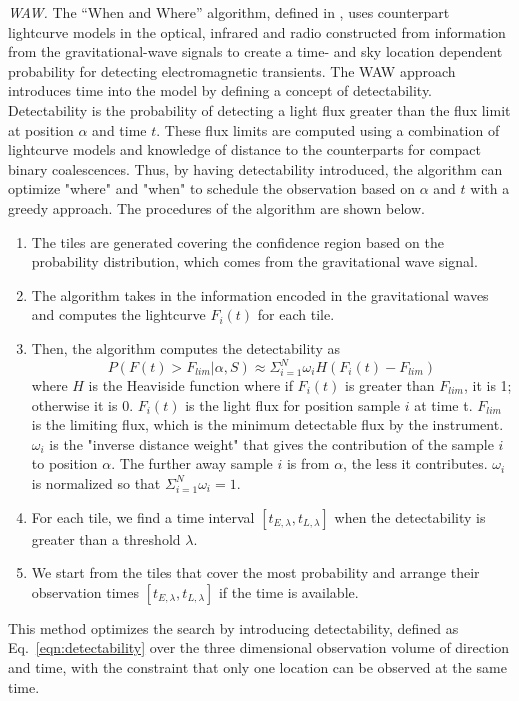 \documentclass[twocolumn]{aastex62}
\begin{document}
\emph{WAW.} The ``When and Where'' algorithm, defined in \cite{SoCo2017}, uses counterpart lightcurve models in the optical, infrared and radio constructed from information from the gravitational-wave signals to create a time- and sky location dependent probability for detecting electromagnetic transients. The WAW approach introduces time into the model by defining a concept of detectability. Detectability is the probability of detecting a light flux greater than the flux limit at position $\alpha$ and time $t$. These flux limits are computed using a combination of lightcurve models and knowledge of distance to the counterparts for compact binary coalescences. Thus, by having detectability introduced, the algorithm can optimize "where" and "when" to schedule the observation based on $\alpha$ and $t$ with a greedy approach. The procedures of the algorithm are shown below.
\begin{enumerate}
\item The tiles are generated covering the confidence region based on the probability distribution, which comes from the gravitational wave signal.
\item The algorithm takes in the information encoded in the gravitational waves and computes the lightcurve $F_i(t)$ for each tile. 
\item Then, the algorithm computes the detectability as
\begin{equation}\label{eqn:detectability}
P(F(t) > F_{lim}|\alpha, S)\approx\Sigma_{i=1}^N\omega_i H(F_i(t)-F_{lim})
\end{equation}
where $H$ is the Heaviside function where if $F_i(t)$ is greater than $F_{lim}$, it is 1; otherwise it is 0. $F_i(t)$ is the light flux for position sample $i$ at time t. $F_{lim}$ is the limiting flux, which is the minimum detectable flux by the instrument. $\omega_i$ is the "inverse distance weight" that gives the contribution of the sample $i$ to position $\alpha$. The further away sample $i$ is from $\alpha$, the less it contributes. $\omega_i$ is normalized so that $\Sigma_{i=1}^N\omega_i=1$. 
\item For each tile, we find a time interval $[t_{E,\lambda},t_{L,\lambda}]$ when the detectability is greater than a threshold $\lambda$.
\item We start from the tiles that cover the most probability and arrange their observation times $[t_{E,\lambda},t_{L,\lambda}]$ if the time is available.
\end{enumerate}
This method optimizes the search by introducing detectability, defined as Eq.~\ref{eqn:detectability} over the three dimensional observation volume of direction and time, with the constraint that only one location can be observed at the same time.
\end{document}
